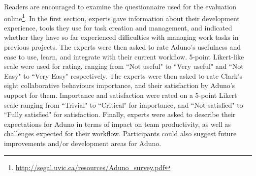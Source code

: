 \documentclass[conference]{IEEEtran}
\newcommand{\cmark}{\ding{51}}%
\begin{document}
%

Readers are encouraged to examine the questionnaire used for the evaluation online\footnote{\url{http://segal.uvic.ca/resources/Aduno_survey.pdf}}. In the first section, experts gave information about their development experience, tools they use for task creation and management, and indicated whether they have so far experienced difficulties with managing work tasks in previous projects. The experts were then asked to rate Aduno's usefulness and ease to use, learn, and integrate with their current workflow. 5-point Likert-like scale were used for rating, ranging from ``Not useful" to ``Very useful" and ``Not Easy" to ``Very Easy" respectively. The experts were then asked to rate Clark's~\cite{Clark96} eight collaborative behaviours importance, and their satisfaction by Aduno's support for them. Importance and satisfaction were rated on a 5-point Likert scale ranging from ``Trivial" to ``Critical" for importance, and ``Not satisfied" to ``Fully satisfied" for satisfaction. Finally, experts were asked to describe their expectations for Aduno in terms of impact on team productivity, as well as challenges expected for their workflow. Participants could also suggest future improvements and/or development areas for Aduno.
\end{document}
